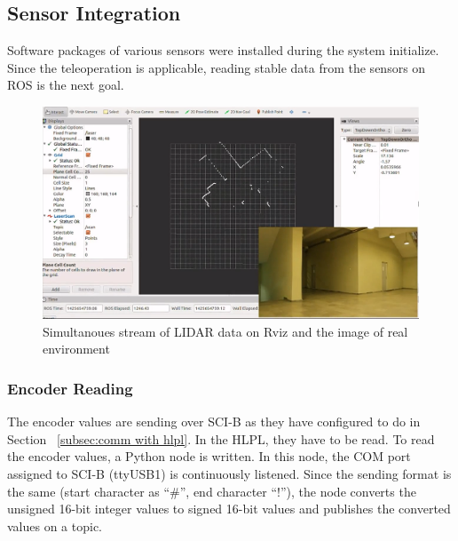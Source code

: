 	\subsection{Sensor Integration}
	\label{subsec:sensor integration}
	Software packages of various sensors were installed during the system initialize. Since the teleoperation is applicable, reading stable data from the sensors on ROS is the next goal. 
		\begin{figure}[h]
			\centering
			\includegraphics[scale=0.3]{images/lidar-sim}
			\caption{Simultanoues stream of LIDAR data on Rviz and the image of real environment}
			\label{fig:lidar-sim}
		\end{figure} 
		\subsubsection{Encoder Reading}
		\label{subsec:encoder reading}
		The encoder values are sending over SCI-B as they have configured to do in Section ~\ref{subsec:comm with hlpl}. In the HLPL, they have to be read. To read the encoder values, a Python node is written. In this node, the COM port assigned to SCI-B (ttyUSB1) is continuously listened. Since the sending format is the same (start character as “\#”, end character “!”), the node converts the unsigned 16-bit integer values to signed 16-bit values and publishes the converted values on a topic. 
